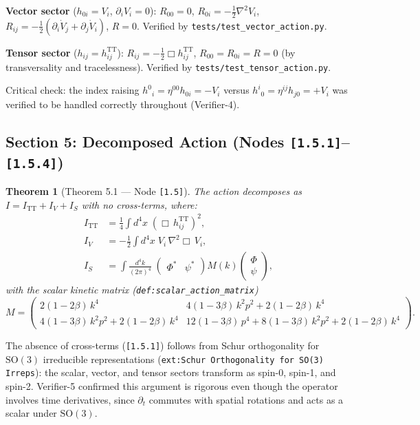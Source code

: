 \documentclass[11pt,a4paper]{article}
\newtheorem{theorem}{Theorem}[section]
\newcommand{\p}{\partial}
\newcommand{\lap}{\nabla^2}
\newcommand{\dbox}{\Box}
\newcommand{\TT}{\mathrm{TT}}
\newcommand{\afnode}[1]{\texttt{[#1]}}
\newcommand{\aftest}[1]{\texttt{tests/#1}}
\newcommand{\afdef}[1]{\texttt{def:#1}}
\newcommand{\afext}[1]{\texttt{ext:#1}}
\begin{document}
\textbf{Vector sector} ($h_{0i} = V_i$, $\p_i V_i = 0$):
$R_{00} = 0$, $R_{0i} = -\tfrac{1}{2}\lap V_i$,
$R_{ij} = -\tfrac{1}{2}(\p_i\dot{V}_j + \p_j\dot{V}_i)$, $R = 0$.
Verified by \aftest{test\_vector\_action.py}.

\textbf{Tensor sector} ($h_{ij} = h^{\TT}_{ij}$):
$R_{ij} = -\tfrac{1}{2}\dbox h^{\TT}_{ij}$,
$R_{00} = R_{0i} = R = 0$ (by transversality and tracelessness).
Verified by \aftest{test\_tensor\_action.py}.

Critical check: the index raising $h^0{}_i = \eta^{00}h_{0i} = -V_i$ versus
$h^i{}_0 = \eta^{ij}h_{j0} = +V_i$ was verified to be handled correctly throughout
(Verifier-4).

\subsection{Section 5: Decomposed Action (Nodes \afnode{1.5.1}--\afnode{1.5.4})}

\begin{theorem}[Theorem 5.1 --- Node \afnode{1.5}]
The action decomposes as $I = I_{\TT} + I_V + I_S$ with no cross-terms, where:
\begin{align}
I_{\TT} &= \tfrac{1}{4}\int d^4x\;(\dbox\,h^{\TT}_{ij})^2, \\
I_V &= -\tfrac{1}{2}\int d^4x\; V_i\,\lap\dbox\, V_i, \\
I_S &= \int \frac{d^4k}{(2\pi)^4}\;
\begin{pmatrix}\Phi^* & \psi^*\end{pmatrix} M(k)
\begin{pmatrix}\Phi \\ \psi\end{pmatrix},
\end{align}
with the scalar kinetic matrix (\afdef{scalar\_action\_matrix})
\begin{equation}
M = \begin{pmatrix}
2(1-2\beta)\,k^4 & 4(1-3\beta)\,k^2p^2 + 2(1-2\beta)\,k^4 \\
4(1-3\beta)\,k^2p^2 + 2(1-2\beta)\,k^4 &
12(1-3\beta)\,p^4 + 8(1-3\beta)\,k^2p^2 + 2(1-2\beta)\,k^4
\end{pmatrix}.
\label{eq:matrix_M}
\end{equation}
\end{theorem}

The absence of cross-terms (\afnode{1.5.1}) follows from Schur orthogonality
for $\mathrm{SO}(3)$ irreducible representations
(\afext{Schur Orthogonality for SO(3) Irreps}):
the scalar, vector, and tensor sectors transform as spin-0, spin-1, and spin-2.
Verifier-5 confirmed this argument is rigorous even though the operator involves
time derivatives, since $\p_t$ commutes with spatial rotations and acts as a scalar
under $\mathrm{SO}(3)$.
\end{document}
